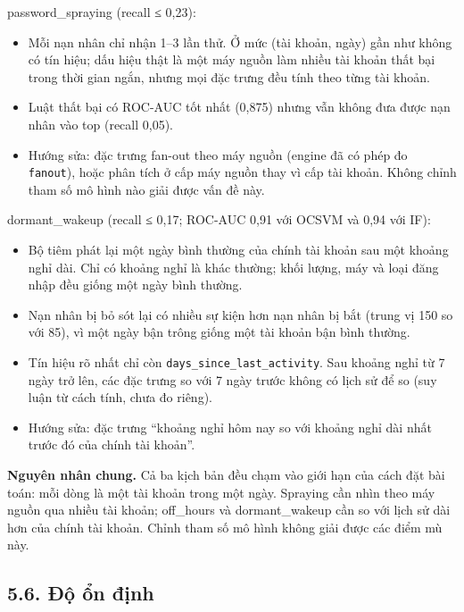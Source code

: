 \documentclass[
  11pt,
]{article}
\providecommand{\tightlist}{%
  \setlength{\itemsep}{0pt}\setlength{\parskip}{0pt}}
\begin{document}
password\_\allowbreak{}spraying (recall ≤ 0,23):

\begin{itemize}
\tightlist
\item
  Mỗi nạn nhân chỉ nhận 1--3 lần thử. Ở mức (tài khoản, ngày) gần như
  không có tín hiệu; dấu hiệu thật là một máy nguồn làm nhiều tài khoản
  thất bại trong thời gian ngắn, nhưng mọi đặc trưng đều tính theo từng
  tài khoản.
\item
  Luật thất bại có ROC-AUC tốt nhất (0,875) nhưng vẫn không đưa được nạn
  nhân vào top (recall 0,05).
\item
  Hướng sửa: đặc trưng fan-out theo máy nguồn (engine đã có phép đo
  \texttt{fanout}), hoặc phân tích ở cấp máy nguồn thay vì cấp tài
  khoản. Không chỉnh tham số mô hình nào giải được vấn đề này.
\end{itemize}

dormant\_\allowbreak{}wakeup (recall ≤ 0,17; ROC-AUC 0,91 với OCSVM và
0,94 với IF):

\begin{itemize}
\tightlist
\item
  Bộ tiêm phát lại một ngày bình thường của chính tài khoản sau một
  khoảng nghỉ dài. Chỉ có khoảng nghỉ là khác thường; khối lượng, máy và
  loại đăng nhập đều giống một ngày bình thường.
\item
  Nạn nhân bị bỏ sót lại có nhiều sự kiện hơn nạn nhân bị bắt (trung vị
  150 so với 85), vì một ngày bận trông giống một tài khoản bận bình
  thường.
\item
  Tín hiệu rõ nhất chỉ còn
  \texttt{days\_\allowbreak{}since\_\allowbreak{}last\_\allowbreak{}activity}.
  Sau khoảng nghỉ từ 7 ngày trở lên, các đặc trưng so với 7 ngày trước
  không có lịch sử để so (suy luận từ cách tính, chưa đo riêng).
\item
  Hướng sửa: đặc trưng ``khoảng nghỉ hôm nay so với khoảng nghỉ dài nhất
  trước đó của chính tài khoản''.
\end{itemize}

\textbf{Nguyên nhân chung.} Cả ba kịch bản đều chạm vào giới hạn của
cách đặt bài toán: mỗi dòng là một tài khoản trong một ngày. Spraying
cần nhìn theo máy nguồn qua nhiều tài khoản; off\_\allowbreak{}hours và
dormant\_\allowbreak{}wakeup cần so với lịch sử dài hơn của chính tài
khoản. Chỉnh tham số mô hình không giải được các điểm mù này.

\hypertarget{ux111ux1ed9-ux1ed5n-ux111ux1ecbnh}{%
\subsection{5.6. Độ ổn định}\label{ux111ux1ed9-ux1ed5n-ux111ux1ecbnh}}
\end{document}
